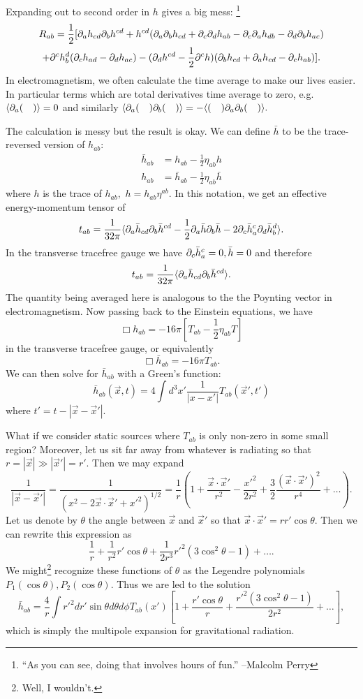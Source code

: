 Expanding out to second order in $h$ gives a big mess:%
    \footnote{``As you can see, doing that involves hours of fun.'' --Malcolm Perry}
\begin{multline*}
    R_{ab}=\frac{1}{2}[\partial_a h_{cd} \partial_b h^{cd}+h^{cd}(\partial_a \partial_b h_{cd}+\partial_c \partial_d h_{ab}-\partial_c \partial_a h_{db}-\partial_d \partial_b h_{ac})\\
    +\partial^c h^d_b(\partial_c h_{ad}-\partial_dh_{ac})-(\partial_d h^{cd}-\frac{1}{2}\partial^c h)(\partial_b h_{cd}+\partial_a h_{cd}-\partial_c h_{ab})].
\end{multline*}
In electromagnetism, we often calculate the time average to make our lives easier. In particular terms which are total derivatives time average to zero, e.g. $\langle\partial_a(\quad)\rangle=0$ and similarly $\langle\partial_a(\quad)\partial_b(\quad)\rangle=-\langle(\quad)\partial_a\partial_b(\quad)\rangle.$

The calculation is messy but the result is okay. We can define $\bar h$ to be the trace-reversed version of $h_{ab}$:
\begin{align*}
    \bar h_{ab}&=h_{ab}-\frac{1}{2}\eta_{ab} h\\
    h_{ab}&=\bar h_{ab}-\frac{1}{2}\eta_{ab}\bar h
\end{align*}
where $h$ is the trace of $h_{ab},$ $h=h_{ab}\eta^{ab}$. In this notation, we get an effective energy-momentum tensor of
$$t_{ab}=\frac{1}{32\pi}\langle\partial_a \bar h_{cd}\partial_b \bar h^{cd}-\frac{1}{2}\partial_a \bar h \partial_b \bar h-2\partial_c \bar h_a^c \partial_d \bar h_b^d\rangle.$$
In the transverse tracefree gauge we have $\partial_c \bar h^c_a=0,\bar h=0$ and therefore
$$t_{ab}=\frac{1}{32\pi}\langle\partial_a \bar h_{cd} \partial_b \bar h^{cd}\rangle.$$
The quantity being averaged here is analogous to the the Poynting vector in electromagnetism. Now passing back to the Einstein equations, we have
$$\Box h_{ab}=-16\pi[T_{ab}-\frac{1}{2}\eta_{ab}T]$$
in the transverse tracefree gauge, or equivalently
$$\Box \bar h_{ab}=-16\pi T_{ab}.$$
We can then solve  for $\bar h_{ab}$ with a Green's function:
$$\bar h_{ab}(\vec x,t)=4\int d^3 x'\frac{1}{| x-x'|}T_{ab}(\vec x',t')$$
where $t'=t-|\vec x-\vec x'|$.

What if we consider static sources where $T_{ab}$ is only non-zero in some small region? Moreover, let us sit far away from whatever is radiating so that $r=|\vec x|\gg |\vec x'|=r'$. Then we may expand
$$\frac{1}{|\vec x-\vec x'|}=\frac{1}{(x^2-2\vec x \cdot \vec x' + {x'}^2)^{1/2}}=\frac{1}{r}\left(1+\frac{\vec x \cdot \vec x'}{r^2}-\frac{{x'}^2}{2r^2}+\frac{3}{2}\frac{(\vec x \cdot \vec x')^2}{r^4}+\ldots\right).$$
Let us denote by $\theta$ the angle between $\vec x$ and $\vec x'$ so that $\vec x \cdot \vec x'=r r' \cos\theta$. Then we can rewrite this expression as
$$\frac{1}{r}+\frac{1}{r^2}r' \cos\theta +\frac{1}{2r^3} r'^2(3\cos^2\theta-1)+\ldots.$$
We might\footnote{Well, I wouldn't.} recognize these functions of $\theta$ as the Legendre polynomials $P_1(\cos\theta),P_2(\cos\theta)$. Thus we are led to the solution
$$\bar h_{ab}=\frac{4}{r}\int {r'}^2 dr' \sin\theta d\theta d\phi T_{ab}(x')\left[1+\frac{r'\cos\theta}{r}+\frac{{r'}^2 (3\cos^2\theta-1)}{2r^2}+\ldots\right],$$
which is simply the multipole expansion for gravitational radiation.